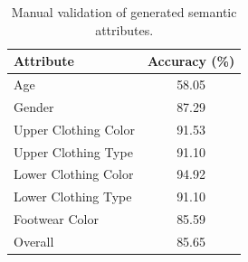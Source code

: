 \begin{table}[t]
\centering
\caption{Manual validation of generated semantic attributes.}
\label{tab:validation}
\begin{tabular}{lc}
\hline
Attribute & Accuracy (\%)\\
\hline
Age & 58.05\\
Gender & 87.29\\
Upper Clothing Color & 91.53\\
Upper Clothing Type & 91.10\\
Lower Clothing Color & 94.92\\
Lower Clothing Type & 91.10\\
Footwear Color & 85.59\\
\hline
Overall & 85.65\\
\hline
\end{tabular}
\end{table}
